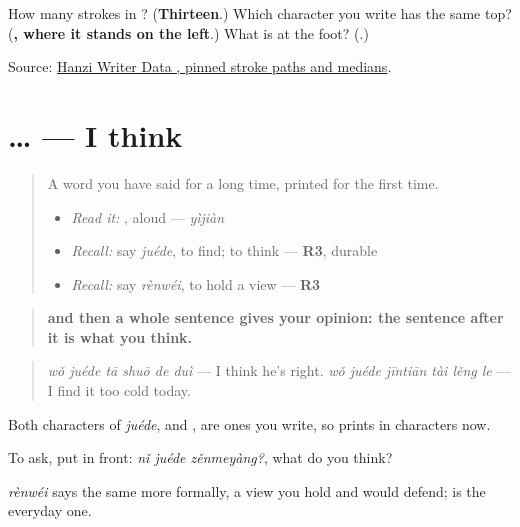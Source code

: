 \begin{tcolorbox}[breakable,colback=teal!4,colframe=teal!35!black,title={Before you move on}]
How many strokes in ? (\textbf{Thirteen}.) Which character you write has the same top? (\textbf{, where it stands on the left}.) What is at the foot? (\textbf{}.)

Source: \href{https://raw.githubusercontent.com/chanind/hanzi-writer-data/68d10a4b21150cae5e1ebbd223eed289cf32d90c/data/\%E6\%84\%8F.json}{Hanzi Writer Data , pinned stroke paths and medians}.
\end{tcolorbox}
\section[\texorpdfstring{\zh{我觉得}… (wǒ juéde …)}{我觉得… (wǒ juéde …)}]{… — I think}

\label{lesson:ZH-C280-juede}



\begin{quote}
A word you have said for a long time, printed for the first time.

\begin{itemize}
\raggedright
  \item \emph{Read it:} , aloud — \emph{yìjiàn}
  \item \emph{Recall:} say \emph{juéde}, to find; to think — \textbf{R3}, durable
  \item \emph{Recall:} say \emph{rènwéi}, to hold a view — \textbf{R3}
\end{itemize}
\end{quote}

\begin{grammarlens}[title={Grammar Lens: \zh{我觉得} and a whole sentence}]
\begin{quote}
\textbf{ and then a whole sentence gives your opinion: the sentence after it is what you think.}
\end{quote}

\begin{quote}
\textbf{} \emph{wǒ juéde tā shuō de duì} — I think he's right. \textbf{} \emph{wǒ juéde jīntiān tài lěng le} — I find it too cold today.
\end{quote}

Both characters of \emph{juéde},  and , are ones you write, so  prints in characters now.

To ask, put  in front: \emph{nǐ juéde zěnmeyàng?}, what do you think?

\emph{rènwéi} says the same more formally, a view you hold and would defend;  is the everyday one.
\end{grammarlens}

